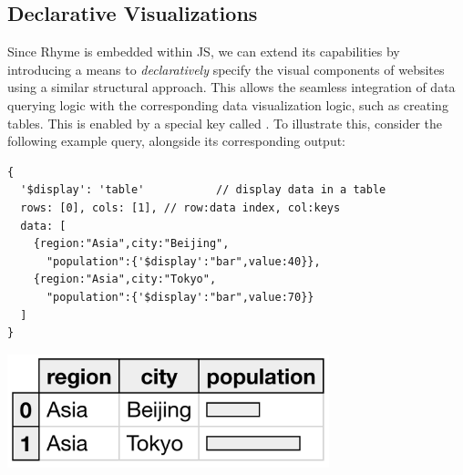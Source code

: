 \documentclass[runningheads]{llncs}
\newcommand{\lang}{Rhyme}
\begin{document}


\vspace{-3mm}
\subsection{Declarative Visualizations}\label{subsec:view}
\vspace{-2mm}
Since \lang{} is embedded within JS, we can extend its capabilities by introducing
a means to \emph{declaratively} specify the visual components of websites using a similar
structural approach.
This allows the seamless integration of data querying logic with the corresponding
data visualization logic, such as creating tables.
This is enabled by a special key called .
To illustrate this, consider the following example query, alongside its corresponding output:

\hspace{-18pt}
\begin{minipage}{0.6\textwidth}
\begin{lstlisting}[style=JavaScript,columns=flexible]
{
  '$display': 'table'           // display data in a table
  rows: [0], cols: [1], // row:data index, col:keys
  data: [
    {region:"Asia",city:"Beijing",
      "population":{'$display':"bar",value:40}},
    {region:"Asia",city:"Tokyo",
      "population":{'$display':"bar",value:70}}
  ]
}
\end{lstlisting}
\end{minipage}%
\begin{minipage}{0.4\textwidth}
\includegraphics[width=0.7\textwidth]{images/small_table.png}
\end{minipage}
\end{document}
